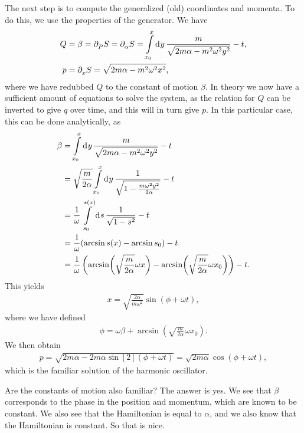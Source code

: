 The next step is to compute the generalized (old) coordinates and momenta. To do this, we use the properties of the generator. We have
\begin{align*}
	Q &= \beta = \partial^{}_{P}S = \partial^{}_{\alpha}S = \int\limits_{x_{0}}^{x}\dd[]{y}\frac{m}{\sqrt{2m\alpha - m^{2}\omega^{2}y^{2}}} - t, \\
	p &= \partial^{}_{x}S = \sqrt{2m\alpha - m^{2}\omega^{2}x^{2}},
\end{align*}
where we have redubbed $Q$ to the constant of motion $\beta$. In theory we now have a sufficient amount of equations to solve the system, as the relation for $Q$ can be inverted to give $q$ over time, and this will in turn give $p$. In this particular case, this can be done analytically, as
\begin{align*}
	\beta &= \int\limits_{x_{0}}^{x}\dd[]{y}\frac{m}{\sqrt{2m\alpha - m^{2}\omega^{2}y^{2}}} - t \\
	      &= \sqrt{\frac{m}{2\alpha}}\int\limits_{x_{0}}^{x}\dd[]{y}\frac{1}{\sqrt{1 - \frac{m\omega^{2}y^{2}}{2\alpha}}} - t \\
	      &= \frac{1}{\omega}\int\limits_{s_{0}}^{s(x)}\dd[]{s}\frac{1}{\sqrt{1 - s^{2}}} - t \\
	      &= \frac{1}{\omega}(\arcsin{s(x)} - \arcsin{s_{0}}) - t \\
	      &= \frac{1}{\omega}\left(\arcsin(\sqrt{\frac{m}{2\alpha}}\omega x) - \arcsin(\sqrt{\frac{m}{2\alpha}}\omega x_{0})\right) - t.
\end{align*}
This yields
\begin{align*}
	x = \sqrt{\frac{2\alpha}{m\omega^{2}}}\sin(\phi + \omega t),
\end{align*}
where we have defined
\begin{align*}
	\phi = \omega\beta + \arcsin(\sqrt{\frac{m}{2\alpha}}\omega x_{0}).
\end{align*}
We then obtain
\begin{align*}
	p = \sqrt{2m\alpha - 2m\alpha\sin[2](\phi + \omega t)} = \sqrt{2m\alpha}\cos(\phi + \omega t),
\end{align*}
which is the familiar solution of the harmonic oscillator.

Are the constants of motion also familiar? The answer is yes. We see that $\beta$ corresponds to the phase in the position and momentum, which are known to be constant. We also see that the Hamiltonian is equal to $\alpha$, and we also know that the Hamiltonian is constant. So that is nice.


